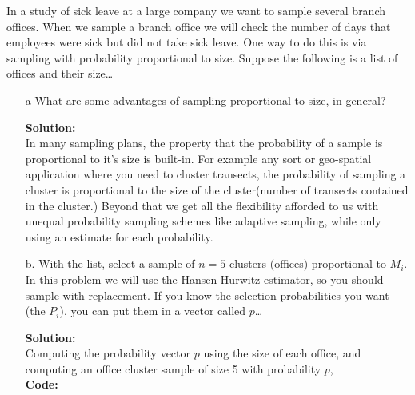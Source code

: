 \documentclass[12pt]{article}
\makeatletter
\theoremstyle{homework}
\newenvironment{exercise}[1]
{\def\@currentlabel{#1}\exercisecore}
{\endexercisecore}
\newcommand{\localhead}[1]{\par\smallskip\noindent\textbf{#1}\nobreak\\}%
\newcommand\solution{\localhead{Solution:}}
\makeatother
\begin{document}
\begin{exercise}{1} In a study of sick leave at a large company we want to sample 
  several branch offices. When we sample a branch office we will check the number 
  of days that employees were sick but did not take sick leave. One way to do this 
  is via sampling with probability proportional to size. Suppose the following is a 
  list of offices and their size\dots\\
\begin{enumerate}
  \item[a] What are some advantages of sampling proportional to size, in general?\\
  \solution In many sampling plans, the property that the probability of a sample is proportional to it's size is 
  built-in. For example any sort or geo-spatial application where you need to cluster transects, the probability of 
  sampling a cluster is proportional to the size of the cluster(number of transects contained in the cluster.) Beyond that 
  we get all the flexibility afforded to us with unequal probability sampling schemes like adaptive sampling, while only using an estimate for 
  each probability. 
  \vspace{1in}

  \item[b.]  With the list, select a sample of $n = 5$ clusters (offices) proportional to $M_i$. 
  In this problem we will use the Hansen-Hurwitz estimator, so you should sample with replacement. 
  If you know the selection probabilities you want (the $P_i$), you can put them in a vector called $p$\dots\\
  \solution Computing the probability vector $p$ using the size of each office, and computing an office cluster sample of size 
  5 with probability $p$, \\
  \textbf{Code:}
\begin{center}
   
\end{center}
\vspace{1 in}


\end{enumerate}
\end{exercise}
\end{document}
